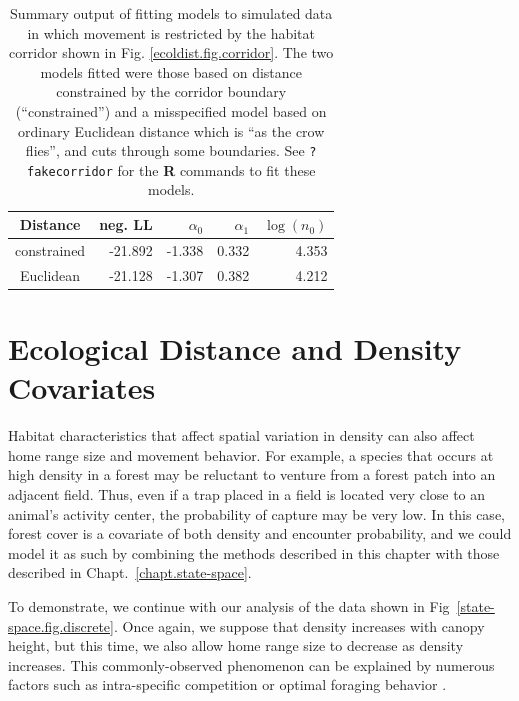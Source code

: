 \begin{table}
\centering
\caption{
Summary output of fitting models to simulated data in which movement
is restricted by the habitat corridor shown in
Fig. \ref{ecoldist.fig.corridor}. The two models fitted were those
based on distance  constrained by the corridor boundary
(``constrained'') and a misspecified model based on ordinary Euclidean
distance which is ``as the crow flies'', and cuts through some
boundaries.
See \mbox{\tt ?fakecorridor} for the {\bf R} commands to fit these
models.
}
\begin{tabular}{c|rrrr} \hline \hline
Distance    &  neg. LL &    $\alpha_0$   & $\alpha_1$    & $\log(n_0)$ \\ \hline
constrained & -21.892 &  -1.338 & 0.332 & 4.353 \\
Euclidean   & -21.128 &  -1.307 & 0.382 & 4.212 \\ \hline
\end{tabular}
\label{rsf.tab.fakecorridor}
\end{table}


\section{Ecological Distance and Density Covariates}
\label{chapt.ecoldist.sec.ssed}

Habitat characteristics that affect spatial variation in density can
also affect home range size and movement behavior. For example, a
species that occurs at high density in a forest may be reluctant to
venture from a forest patch into an adjacent field. Thus, even if a
trap placed in a field is located very close to an animal's activity
center, the probability of capture may be very
low. In this case, forest cover is a covariate of
both density and encounter probability,
and we could model it as such by combining the methods described in
this chapter with those described in Chapt.~\ref{chapt.state-space}.

To demonstrate, we continue with our analysis of the data shown in
Fig~\ref{state-space.fig.discrete}. Once again, we suppose that density
increases with canopy height, but this time, we also allow
home range size to decrease as density increases. This
commonly-observed phenomenon can be explained by numerous factors such
as intra-specific competition \citep{sillett_etal:2004} or optimal
foraging behavior \citep{tufto_etal:1996,said_servanty:2005}.

